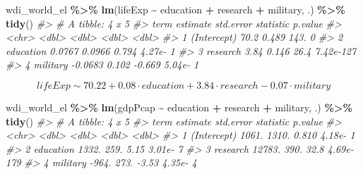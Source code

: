 \documentclass[
  xelatex, ja=standard]{bxjsbook}
\newenvironment{Shaded}{\begin{snugshade}}{\end{snugshade}}
\newcommand{\CommentTok}[1]{\textcolor[rgb]{0.56,0.35,0.01}{\textit{#1}}}
\newcommand{\FunctionTok}[1]{\textcolor[rgb]{0.13,0.29,0.53}{\textbf{#1}}}
\newcommand{\NormalTok}[1]{#1}
\newcommand{\SpecialCharTok}[1]{\textcolor[rgb]{0.81,0.36,0.00}{\textbf{#1}}}
\theoremstyle{definition}
\theoremstyle{definition}
\theoremstyle{definition}
\theoremstyle{definition}
\theoremstyle{remark}
\begin{document}
\begin{Shaded}
\begin{Highlighting}[]
\NormalTok{wdi\_world\_el }\SpecialCharTok{\%\textgreater{}\%} \FunctionTok{lm}\NormalTok{(lifeExp }\SpecialCharTok{\textasciitilde{}}\NormalTok{ education }\SpecialCharTok{+}\NormalTok{ research }\SpecialCharTok{+}\NormalTok{ military, .) }\SpecialCharTok{\%\textgreater{}\%} \FunctionTok{tidy}\NormalTok{()}
\CommentTok{\#\textgreater{} \# A tibble: 4 x 5}
\CommentTok{\#\textgreater{}   term        estimate std.error statistic   p.value}
\CommentTok{\#\textgreater{}   \textless{}chr\textgreater{}          \textless{}dbl\textgreater{}     \textless{}dbl\textgreater{}     \textless{}dbl\textgreater{}     \textless{}dbl\textgreater{}}
\CommentTok{\#\textgreater{} 1 (Intercept)  70.2       0.489    143.    0        }
\CommentTok{\#\textgreater{} 2 education     0.0767    0.0966     0.794 4.27e{-}  1}
\CommentTok{\#\textgreater{} 3 research      3.84      0.146     26.4   7.42e{-}127}
\CommentTok{\#\textgreater{} 4 military     {-}0.0683    0.102     {-}0.669 5.04e{-}  1}
\end{Highlighting}
\end{Shaded}

\[lifeExp \sim 70.22 + 0.08\cdot education + 3.84 \cdot research - 0.07 \cdot military\]

\begin{Shaded}
\begin{Highlighting}[]
\NormalTok{wdi\_world\_el }\SpecialCharTok{\%\textgreater{}\%} \FunctionTok{lm}\NormalTok{(gdpPcap }\SpecialCharTok{\textasciitilde{}}\NormalTok{ education }\SpecialCharTok{+}\NormalTok{ research }\SpecialCharTok{+}\NormalTok{ military, .) }\SpecialCharTok{\%\textgreater{}\%} \FunctionTok{tidy}\NormalTok{()}
\CommentTok{\#\textgreater{} \# A tibble: 4 x 5}
\CommentTok{\#\textgreater{}   term        estimate std.error statistic   p.value}
\CommentTok{\#\textgreater{}   \textless{}chr\textgreater{}          \textless{}dbl\textgreater{}     \textless{}dbl\textgreater{}     \textless{}dbl\textgreater{}     \textless{}dbl\textgreater{}}
\CommentTok{\#\textgreater{} 1 (Intercept)    1061.     1310.     0.810 4.18e{-}  1}
\CommentTok{\#\textgreater{} 2 education      1332.      259.     5.15  3.01e{-}  7}
\CommentTok{\#\textgreater{} 3 research      12783.      390.    32.8   4.69e{-}179}
\CommentTok{\#\textgreater{} 4 military       {-}964.      273.    {-}3.53  4.35e{-}  4}
\end{Highlighting}
\end{Shaded}
\end{document}
